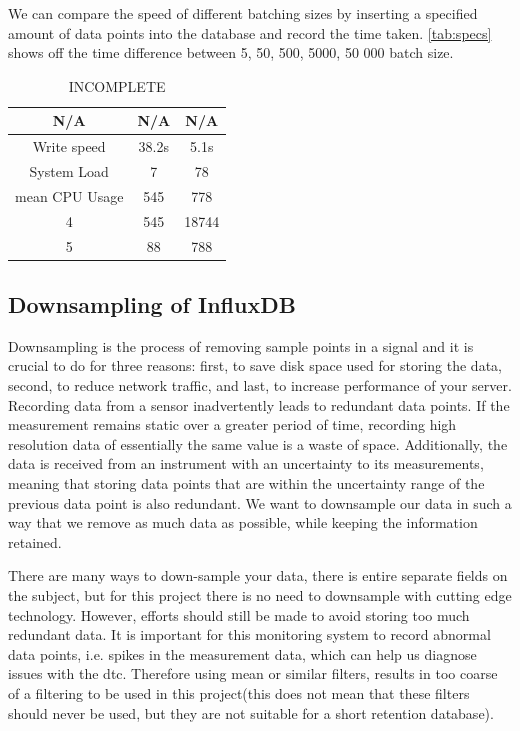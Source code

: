 \documentclass[main.tex]{subfiles}
\begin{document}
We can compare the speed of different batching sizes by inserting a specified amount of data points into the database and record the time taken. \autoref{tab:specs} shows off the time difference between 5, 50, 500, 5000, 50 000 batch size.

\begin{table}[h]
\centering
\begin{tabular}{||c c c||} 
 \hline
 N/A & N/A & N/A \\ [0.5ex] 
 \hline\hline
 Write speed & 38.2s & 5.1s \\ 
 \hline
 System Load & 7 & 78  \\
 \hline
 mean CPU Usage & 545 & 778 \\
 \hline
 4 & 545 & 18744\\
 \hline
 5 & 88 & 788\\ [1ex] 
 \hline

\end{tabular}
\caption{\label{tab:specs} INCOMPLETE}
\end{table}
\FloatBarrier


 
 
 \subsection{Downsampling of InfluxDB}
 


 Downsampling is the process of removing sample points in a signal and it is crucial to do for three reasons: first, to save disk space used for storing the data, second, to reduce network traffic, and last, to increase performance of your server. Recording data from a sensor inadvertently leads to redundant data points. If the measurement remains static over a greater period of time, recording high resolution data of essentially the same value is a waste of space. Additionally, the data is received from an instrument with an uncertainty to its measurements, meaning that storing data points that are within the uncertainty range of the previous data point is also redundant. We want to downsample our data in such a way that we remove as much data as possible, while keeping the information retained.
 
 There are many ways to down-sample your data, there is entire separate fields on the subject, but for this project there is no need to downsample with cutting edge technology. However, efforts should still be made to avoid storing too much redundant data. It is important for this monitoring system to record abnormal data points, i.e. spikes in the measurement data, which can help us diagnose issues with the \gls{dtc}. Therefore using mean or similar filters, results in too coarse of a filtering to be used in this project(this does not mean that these filters should never be used, but they are not suitable for a short retention database).
 
\end{document}
